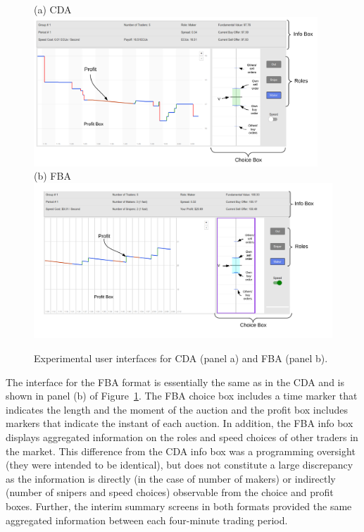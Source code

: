 \documentclass[12pt]{article}
\begin{document}
\begin{figure}
\centering
(a) CDA \\
\includegraphics[width=0.95\textwidth]{img/UI-CDA_with_labels.png} \\
(b) FBA \\
\includegraphics[width=\textwidth]{img/UI-FBA.png}
\caption{Experimental user interfaces for CDA (panel a) and FBA (panel b). \label{fig:UI-CDA}}
\end{figure}

The interface for the FBA format is essentially the same as in the CDA and is shown in panel (b) of Figure~\ref{fig:UI-CDA}.  The FBA choice box includes a time marker that indicates the length and the moment of the auction and the profit box includes markers that indicate the instant of each auction. In addition, the FBA info box displays aggregated information on the roles and speed choices of other traders in the market. This difference from the CDA info box was a programming oversight (they were intended to be identical), but does not constitute a large discrepancy as the information is directly (in the case of number of makers) or indirectly (number of snipers and speed choices) observable from the choice and profit boxes. Further, the interim summary screens in both formats provided the same aggregated information between each four-minute trading period. 
\end{document}
